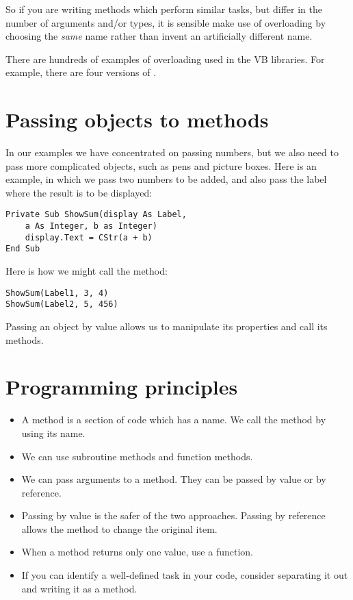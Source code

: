 		So if you are writing methods which perform similar tasks, but differ in the number of arguments and/or types, it is sensible make use of overloading by choosing the \emph{same} name rather than invent an artificially different name.
		
		There are hundreds of examples of overloading used in the VB libraries. For example, there are four versions of .


	\section{Passing objects to methods}
		In our examples we have concentrated on passing numbers, but we also need to pass more complicated objects, such as pens and picture boxes. Here is an example, in which we pass two numbers to be added, and also pass the label where the result is to be displayed:
		\begin{lstlisting}
Private Sub ShowSum(display As Label,
	a As Integer, b as Integer)
	display.Text = CStr(a + b)
End Sub
		\end{lstlisting}
		Here is how we might call the method:
		\begin{lstlisting}
ShowSum(Label1, 3, 4)
ShowSum(Label2, 5, 456)
		\end{lstlisting}
		Passing an object by value allows us to manipulate its properties and call its methods.

	\section{Programming principles}
		\begin{itemize}
			\item A method is a section of code which has a name. We call the method by using its name.
			\item We can use subroutine methods and function methods.
			\item We can pass arguments to a method. They can be passed by value or by reference.
			\item Passing by value is the safer of the two approaches. Passing by reference allows the method to change the original item.
			\item When a method returns only one value, use a function.
			\item If you can identify a well-defined task in your code, consider separating it out and writing it as a method.
		\end{itemize}


